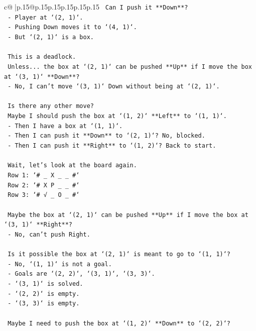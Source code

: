 \documentclass{article}
\begin{document}
{\begin{supertabular}{c@{$\;$}|p{.15\linewidth}@{}p{.15\linewidth}p{.15\linewidth}p{.15\linewidth}p{.15\linewidth}p{.15\linewidth}}
{{{\texttt{   Can I push it **Down**?} \\
\texttt{   {-} Player at `(2, 1)`.} \\
\texttt{   {-} Pushing Down moves it to `(4, 1)`.} \\
\texttt{   {-} But `(2, 1)` is a box.} \\
\\ 
\texttt{   This is a deadlock.} \\
\texttt{   Unless... the box at `(2, 1)` can be pushed **Up** if I move the box at `(3, 1)` **Down**?} \\
\texttt{   {-} No, I can't move `(3, 1)` Down without being at `(2, 1)`.} \\
\\ 
\texttt{   Is there any other move?} \\
\texttt{   Maybe I should push the box at `(1, 2)` **Left** to `(1, 1)`.} \\
\texttt{   {-} Then I have a box at `(1, 1)`.} \\
\texttt{   {-} Then I can push it **Down** to `(2, 1)`? No, blocked.} \\
\texttt{   {-} Then I can push it **Right** to `(1, 2)`? Back to start.} \\
\\ 
\texttt{   Wait, let's look at the board again.} \\
\texttt{   Row 1: `\# \_ X \_ \_ \#`} \\
\texttt{   Row 2: `\# X P \_ \_ \#`} \\
\texttt{   Row 3: `\# √ \_ O \_ \#`} \\
\\ 
\texttt{   Maybe the box at `(2, 1)` can be pushed **Up** if I move the box at `(3, 1)` **Right**?} \\
\texttt{   {-} No, can't push Right.} \\
\\ 
\texttt{   Is it possible the box at `(2, 1)` is meant to go to `(1, 1)`?} \\
\texttt{   {-} No, `(1, 1)` is not a goal.} \\
\texttt{   {-} Goals are `(2, 2)`, `(3, 1)`, `(3, 3)`.} \\
\texttt{   {-} `(3, 1)` is solved.} \\
\texttt{   {-} `(2, 2)` is empty.} \\
\texttt{   {-} `(3, 3)` is empty.} \\
\\ 
\texttt{   Maybe I need to push the box at `(1, 2)` **Down** to `(2, 2)`?} \\
}}}
\end{supertabular}}
\end{document}
